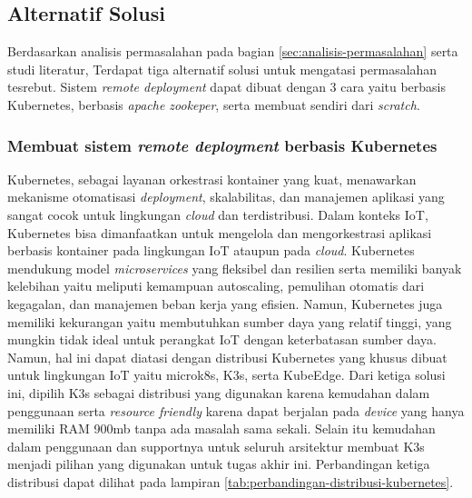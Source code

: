 \subsection{Alternatif Solusi}
\label{sec:analisis-solusi}

Berdasarkan analisis permasalahan pada bagian \ref{sec:analisis-permasalahan} serta studi literatur, Terdapat tiga alternatif solusi untuk mengatasi permasalahan tesrebut. Sistem \textit{remote deployment} dapat dibuat dengan 3 cara yaitu berbasis Kubernetes, berbasis \textit{apache zookeper}, serta membuat sendiri dari \textit{scratch}.

\subsubsection{Membuat sistem \textit{remote deployment} berbasis Kubernetes}
Kubernetes, sebagai layanan orkestrasi kontainer yang kuat, menawarkan mekanisme otomatisasi \textit{deployment}, skalabilitas, dan manajemen aplikasi yang sangat cocok untuk lingkungan \textit{cloud} dan terdistribusi. Dalam konteks IoT, Kubernetes bisa dimanfaatkan untuk mengelola dan mengorkestrasi aplikasi berbasis kontainer pada lingkungan IoT ataupun pada \textit{cloud}. Kubernetes mendukung model \textit{microservices} yang fleksibel dan resilien serta memiliki banyak kelebihan yaitu  meliputi kemampuan autoscaling, pemulihan otomatis dari kegagalan, dan manajemen beban kerja yang efisien. Namun, Kubernetes juga memiliki kekurangan yaitu membutuhkan sumber daya yang relatif tinggi, yang mungkin tidak ideal untuk perangkat IoT dengan keterbatasan sumber daya. Namun, hal ini dapat diatasi dengan distribusi Kubernetes yang khusus dibuat untuk lingkungan IoT yaitu microk8s, K3s, serta KubeEdge. Dari ketiga solusi ini, dipilih K3s sebagai distribusi yang digunakan karena kemudahan dalam penggunaan serta \textit{resource friendly} karena dapat berjalan pada \textit{device} yang hanya memiliki RAM 900mb tanpa ada masalah sama sekali. Selain itu kemudahan dalam penggunaan dan supportnya untuk seluruh arsitektur membuat K3s menjadi pilihan yang digunakan untuk tugas akhir ini. Perbandingan ketiga distribusi dapat dilihat pada lampiran \ref{tab:perbandingan-distribusi-kubernetes}.

